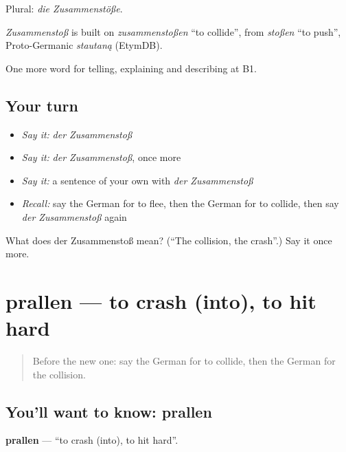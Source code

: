 Plural: \emph{die Zusammenstöße}.

\begin{cousinweb}
\emph{Zusammenstoß} is built on \emph{zusammenstoßen} \textquotedblleft{}to collide\textquotedblright{}, from \emph{stoßen} \textquotedblleft{}to push\textquotedblright{}, Proto-Germanic \emph{stautaną} (EtymDB).
\end{cousinweb}

\begin{grammarlens}[title={What you've built}]
One more word for telling, explaining and describing at B1.
\end{grammarlens}

\subsection*{Your turn}
\begin{itemize}
\raggedright
  \item \emph{Say it:} \emph{der Zusammenstoß}
  \item \emph{Say it:} \emph{der Zusammenstoß}, once more
  \item \emph{Say it:} a sentence of your own with \emph{der Zusammenstoß}
  \item \emph{Recall:} say the German for to flee, then the German for to collide, then say \emph{der Zusammenstoß} again
\end{itemize}

\begin{tcolorbox}[breakable,colback=teal!4,colframe=teal!35!black,title={Before you move on}]
What does der Zusammenstoß mean? (\textquotedblleft{}The collision, the crash\textquotedblright{}.) Say it once more.
\end{tcolorbox}
\section[prallen]{prallen — to crash (into), to hit hard}

\label{lesson:GE-C288-prallen}



\begin{quote}
Before the new one: say the German for to collide, then the German for the collision.
\end{quote}

\subsection*{You'll want to know: prallen}
\textbf{prallen} — \textquotedblleft{}to crash (into), to hit hard\textquotedblright{}.

